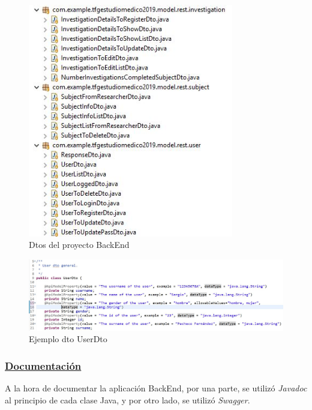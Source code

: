 \begin{itemize}
\begin{itemize}
                    \begin{figure}[h]
                        \centering
                        \includegraphics[width=0.8\textwidth]{images/dto.JPG}
                        \caption{Dtos del proyecto BackEnd}
                    \end{figure}
            
                    \begin{figure}[h]
                        \centering
                        \includegraphics[width=1\textwidth]{images/userdto.JPG}
                        \caption{Ejemplo dto UserDto}
                    \end{figure}
            
            \FloatBarrier
                
                
            \end{itemize}
            
            
        \end{itemize}
        \subsubsection{\underline{Documentación}}
        A la hora de documentar la aplicación BackEnd, por una parte, se utilizó \textit{Javadoc} al principio de cada clase Java, y por otro lado, se utilizó \textit{Swagger}. 
        \newline
        

